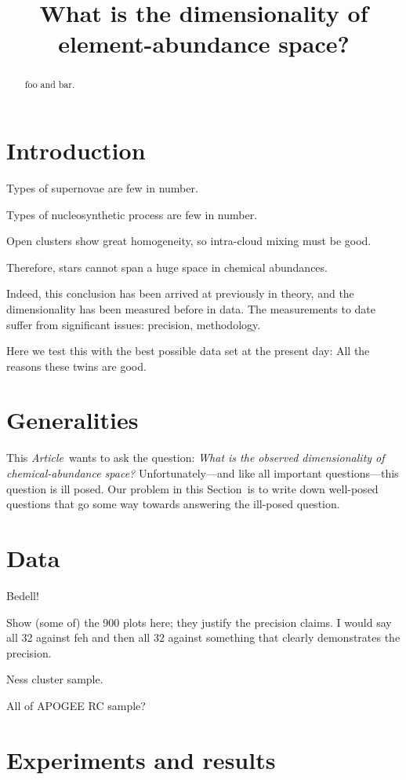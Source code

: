 \documentclass[letterpaper, modern]{aastex62}
\newcommand{\documentname}{\textsl{Article}}
\newcommand{\sectionname}{Section}
\begin{document}
\sloppy\sloppypar\raggedbottom\frenchspacing

\title{What is the dimensionality of element-abundance space?}

\begin{abstract}
foo and bar.
\end{abstract}

\section{Introduction}

Types of supernovae are few in number.

Types of nucleosynthetic process are few in number.

Open clusters show great homogeneity, so intra-cloud mixing must be good.

Therefore, stars cannot span a huge space in chemical abundances.

Indeed, this conclusion has been arrived at previously in theory, and
the dimensionality has been measured before in data. The measurements to
date suffer from significant issues: precision, methodology.

Here we test this with the best possible data set at the present day:
All the reasons these twins are good.

\section{Generalities}

This \documentname\ wants to ask the question:
\emph{What is the observed dimensionality of chemical-abundance
  space?}
Unfortunately---and like all important questions---this question is
ill posed.
Our problem in this \sectionname\ is to write down well-posed questions
that go some way towards answering the ill-posed question.

\section{Data}

Bedell!

Show (some of) the 900 plots here; they justify the precision claims.
I would say all 32 against feh and then all 32 against something that
clearly demonstrates the precision.

Ness cluster sample.

All of APOGEE RC sample?

\section{Experiments and results}
\end{document}
